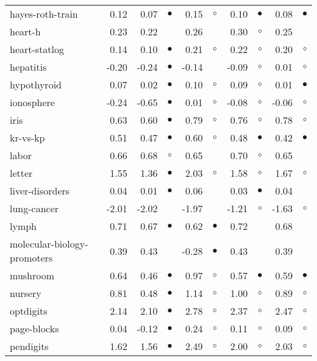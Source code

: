 \begin{table}[thb]
{\begin{tabular}{lrr@{\hspace{0.1cm}}cr@{\hspace{0.1cm}}cr@{\hspace{0.1cm}}cr@{\hspace{0.1cm}}c}
hayes-roth-train &  0.12 &  0.07 & $\bullet$ &  0.15 &   $\circ$ &  0.10 & $\bullet$ &  0.08 & $\bullet$\\
heart-h &  0.23 &  0.22 &           &  0.26 &           &  0.30 &   $\circ$ &  0.25 &          \\
heart-statlog &  0.14 &  0.10 & $\bullet$ &  0.21 &   $\circ$ &  0.22 &   $\circ$ &  0.20 &   $\circ$\\
hepatitis & -0.20 & -0.24 & $\bullet$ & -0.14 &           & -0.09 &   $\circ$ &  0.01 &   $\circ$\\
hypothyroid &  0.07 &  0.02 & $\bullet$ &  0.10 &   $\circ$ &  0.09 &   $\circ$ &  0.01 & $\bullet$\\
ionosphere & -0.24 & -0.65 & $\bullet$ &  0.01 &   $\circ$ & -0.08 &   $\circ$ & -0.06 &   $\circ$\\
iris &  0.63 &  0.60 & $\bullet$ &  0.79 &   $\circ$ &  0.76 &   $\circ$ &  0.78 &   $\circ$\\
kr-vs-kp &  0.51 &  0.47 & $\bullet$ &  0.60 &   $\circ$ &  0.48 & $\bullet$ &  0.42 & $\bullet$\\
labor &  0.66 &  0.68 &   $\circ$ &  0.65 &           &  0.70 &   $\circ$ &  0.65 &          \\
letter &  1.55 &  1.36 & $\bullet$ &  2.03 &   $\circ$ &  1.58 &   $\circ$ &  1.67 &   $\circ$\\
liver-disorders &  0.04 &  0.01 & $\bullet$ &  0.06 &           &  0.03 & $\bullet$ &  0.04 &          \\
lung-cancer & -2.01 & -2.02 &           & -1.97 &           & -1.21 &   $\circ$ & -1.63 &   $\circ$\\
lymph &  0.71 &  0.67 & $\bullet$ &  0.62 & $\bullet$ &  0.72 &           &  0.68 &          \\
molecular-biology-promoters &  0.39 &  0.43 &           & -0.28 & $\bullet$ &  0.43 &           &  0.39 &          \\
mushroom &  0.64 &  0.46 & $\bullet$ &  0.97 &   $\circ$ &  0.57 & $\bullet$ &  0.59 & $\bullet$\\
nursery &  0.81 &  0.48 & $\bullet$ &  1.14 &   $\circ$ &  1.00 &   $\circ$ &  0.89 &   $\circ$\\
optdigits &  2.14 &  2.10 & $\bullet$ &  2.78 &   $\circ$ &  2.37 &   $\circ$ &  2.47 &   $\circ$\\
page-blocks &  0.04 & -0.12 & $\bullet$ &  0.24 &   $\circ$ &  0.11 &   $\circ$ &  0.09 &   $\circ$\\
pendigits &  1.62 &  1.56 & $\bullet$ &  2.49 &   $\circ$ &  2.00 &   $\circ$ &  2.03 &   $\circ$\\

\end{tabular}}
\end{table}
